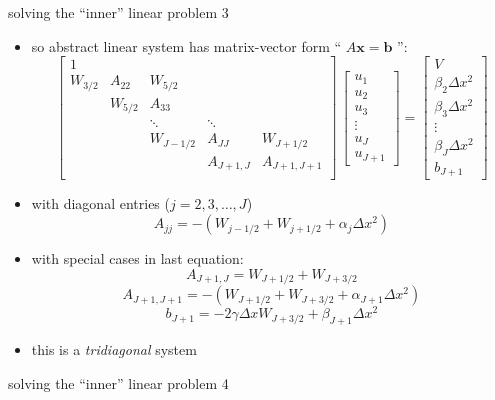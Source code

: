 \begin{frame}{solving the ``inner'' linear problem 3}

\scriptsize
\begin{itemize}
\item so abstract linear system has matrix-vector form `` $A \mathbf{x} = \mathbf{b}$ '':
$$
\begin{bmatrix}
1 &  &  &  &  \\
W_{3/2} & A_{22} & W_{5/2} &  &  \\
 & W_{5/2} & A_{33} &  &  \\
 &  & \ddots & \ddots &  \\
 &  & W_{J-1/2} & A_{JJ} & W_{J+1/2} \\
 &  &  & A_{J+1,J} & A_{J+1,J+1} \\
\end{bmatrix}\,
\begin{bmatrix}
u_1 \\ u_2 \\ u_3 \\ \vdots \\ u_J \\ u_{J+1}
\end{bmatrix}
=
\begin{bmatrix}
V \\ \beta_2 \Delta x^2 \\ \beta_3 \Delta x^2 \\ \vdots \\ \beta_J \Delta x^2 \\ b_{J+1}
\end{bmatrix}
$$
\item with diagonal entries  ($j=2,3,\dots,J$)
$$A_{jj} = -(W_{j-1/2}+W_{j+1/2}+\alpha_j \Delta x^2)$$
\item with special cases in last equation:
$$A_{J+1,J} = W_{J+1/2}+W_{J+3/2}$$
$$A_{J+1,J+1} = -(W_{J+1/2}+W_{J+3/2}+\alpha_{J+1}\Delta x^2)$$
$$b_{J+1} = -2 \gamma \Delta x W_{J+3/2} + \beta_{J+1} \Delta x^2$$
\item this is a \emph{tridiagonal} system
\end{itemize}
\end{frame}


\begin{frame}{solving the ``inner'' linear problem 4}
\label{slide:flowlinecode}

\end{frame}


